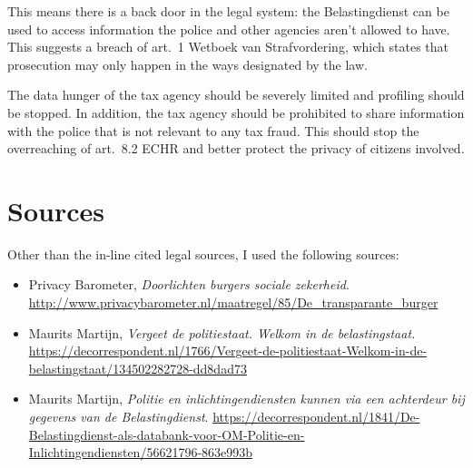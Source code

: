 \documentclass{article}
\begin{document}
This means there is a back door in the legal system: the Belastingdienst can be
used to access information the police and other agencies aren't allowed to have.
This suggests a breach of art.~1 Wetboek van Strafvordering, which states that
prosecution may only happen in the ways designated by the law.

The data hunger of the tax agency should be severely limited and profiling
should be stopped. In addition, the tax agency should be prohibited to share
information with the police that is not relevant to any tax fraud. This should
stop the overreaching of art.~8.2 ECHR and better protect the privacy of
citizens involved.

\section*{Sources}

Other than the in-line cited legal sources, I used the following sources:

\begin{itemize}

    \item Privacy Barometer, \emph{Doorlichten burgers sociale zekerheid}.
        \url{http://www.privacybarometer.nl/maatregel/85/De_transparante_burger}

    \item Maurits Martijn, \emph{Vergeet de politiestaat. Welkom in de 
        belastingstaat.} 
        \url{https://decorrespondent.nl/1766/Vergeet-de-politiestaat-Welkom-in-de-belastingstaat/134502282728-dd8dad73}

    \item Maurits Martijn, \emph{Politie en inlichtingendiensten kunnen via een
        achterdeur bij gegevens van de Belastingdienst}.
        \url{https://decorrespondent.nl/1841/De-Belastingdienst-als-databank-voor-OM-Politie-en-Inlichtingendiensten/56621796-863e993b}

\end{itemize}
\end{document}
